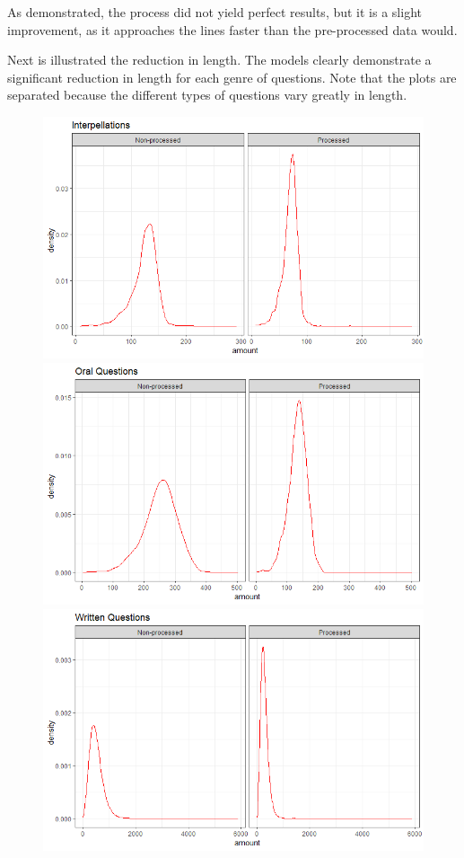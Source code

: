 \documentclass[12pt]{article}
\begin{document}
	As demonstrated, the process did not yield perfect results, but it is a slight improvement, as it approaches the lines faster than the pre-processed data would. 
	
	Next is illustrated the reduction in length. The models clearly demonstrate a significant reduction in length for each genre of questions. Note that the plots are separated because the different types of questions vary greatly in length.
	
	\begin{figure}[ht]
		\centering
		\includegraphics[scale=0.40]{Img/preposttreatedinterpell.PNG}
		\includegraphics[scale=0.40]{Img/prepostmuntligsporsmal.PNG}
		\includegraphics[scale=0.40]{Img/prepostskriftligsporsmal.PNG}

\end{figure}
\end{document}
